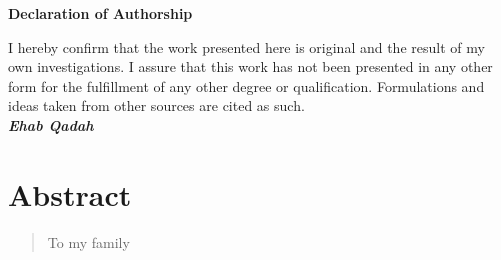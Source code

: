 \documentclass[12pt, %
a4paper, %
twoside, %
openright, %
abstract=on, %
DIV=11,      %
BCOR=8mm,openright]{scrbook}
\begin{document}
	\frontmatter
	
	

	\vspace{4cm}
	
	
	\thispagestyle{empty}
	{\noindent%
		\huge{\textbf{\textsf{Declaration of Authorship}}}
	}
	\vspace{2cm}
	\begin{flushleft}
		\noindent%
				
		I hereby confirm that the work presented here is original and the result of my own investigations. I assure that this work has not been presented in any other
		form for the fulfillment of any other degree or qualification. Formulations and ideas taken from other sources are cited as such.\\
		\vspace{1cm}
		\textbf{\textit{Ehab Qadah}}
	\end{flushleft}
	
	

	\chapter*{Abstract}
	\thispagestyle{empty}
    
    
    
	\newpage    
	\vspace*{\fill} 
	\begin{quote} 
		\centering 
		To my family 
	\end{quote}
	\vspace*{\fill}
	\tableofcontents
	\thispagestyle{empty}
	\listoffigures
	
	\mainmatter
	
		
	
	
	
	
	
	
	
	\FloatBarrier
	
	
	 
\end{document}
